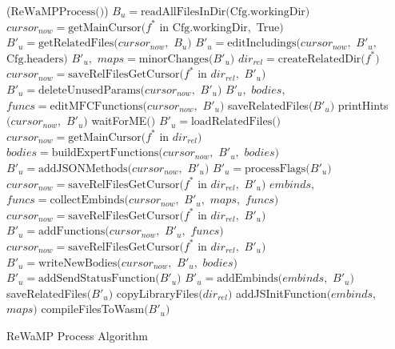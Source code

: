 \setlength{\algomargin}{2em} %
\begin{algorithm}
	\DontPrintSemicolon
	\Begin($\text{ReWaMPProcess} {(} {)}$)
	{
		$B_u = \text{readAllFilesInDir}{(}\textrm{Cfg}.\text{workingDir}{)}$\;
		{
			$cursor_{now} = \text{getMainCursor}{(}f^*$ in $\textrm{Cfg}.\text{workingDir},$ True${)}$\;
			$B'_u = \text{getRelatedFiles}{(}cursor_{now},$ $B_u{)}$\;
			$B'_u = \text{editIncludings}{(}cursor_{now},$ $B'_u,$ $\textrm{Cfg}.\text{headers}{)}$\;
			$B'_u,$ $maps = \text{minorChanges}{(}B'_u{)}$\;
			$dir_{rel} = \text{createRelatedDir}{(}f^*{)}$\;
			$cursor_{now} = \text{saveRelFilesGetCursor}{(}f^*$ in $dir_{rel},$ $B'_u{)}$\;
			$B'_u = \text{deleteUnusedParams}{(}cursor_{now},$ $B'_u{)}$\;
			$B'_u,$ $bodies,$ $funcs = \text{editMFCFunctions}{(}cursor_{now},$ $B'_u{)}$\;
			saveRelatedFiles${(}B'_u{)}$\;
			printHints${(}cursor_{now},$ $B'_u{)}$\;
			waitForME${(}{)}$\;
			$B'_u = \text{loadRelatedFiles}{(}{)}$\;
			$cursor_{now} = \text{getMainCursor}{(}f^*$ in $dir_{rel}{)}$\;
			$bodies = \text{buildExpertFunctions}{(}cursor_{now},$ $B'_u,$ $bodies{)}$\;
			$B'_u = \text{addJSONMethods}{(}cursor_{now},$ $B'_u{)}$\;
			$B'_u = \text{processFlags}{(}B'_u{)}$\;
			$cursor_{now} = \text{saveRelFilesGetCursor}{(}f^*$ in $dir_{rel},$ $B'_u{)}$\;
			$embinds,$ $funcs = \text{collectEmbinds}{(}cursor_{now},$ $B'_u,$ $maps,$ $funcs{)}$\;
			$cursor_{now} = \text{saveRelFilesGetCursor}{(}f^*$ in $dir_{rel},$ $B'_u{)}$\;
			$B'_u = \text{addFunctions}{(}cursor_{now},$ $B'_u,$ $funcs{)}$\;
			$cursor_{now} = \text{saveRelFilesGetCursor}{(}f^*$ in $dir_{rel},$ $B'_u{)}$\;
			$B'_u = \text{writeNewBodies}{(}cursor_{now},$ $B'_u,$ $bodies{)}$\;
			$B'_u = \text{addSendStatusFunction}{(}B'_u{)}$\;
			$B'_u = \text{addEmbinds}{(}embinds,$ $B'_u{)}$\;
			saveRelatedFiles${(}B'_u{)}$\;
			copyLibraryFiles${(}dir_{rel}{)}$\;
			addJSInitFunction${(}embinds,$ $maps{)}$\;
			compileFilesToWasm${(}B'_u{)}$\;
		}\label{endfor}
	}
	\caption{ReWaMP Process Algorithm}\label{alg:rwmp}
\end{algorithm}

